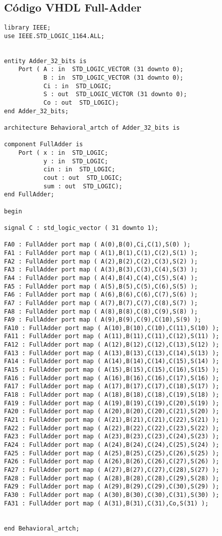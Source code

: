 \documentclass[12pt]{article}
\begin{document}
\subsection{Código VHDL Full-Adder}
\begin{lstlisting}
library IEEE;
use IEEE.STD_LOGIC_1164.ALL;


entity Adder_32_bits is
    Port ( A : in  STD_LOGIC_VECTOR (31 downto 0);
           B : in  STD_LOGIC_VECTOR (31 downto 0);
           Ci : in  STD_LOGIC;
           S : out  STD_LOGIC_VECTOR (31 downto 0);
           Co : out  STD_LOGIC);
end Adder_32_bits;

architecture Behavioral_artch of Adder_32_bits is

component FullAdder is
    Port ( x : in  STD_LOGIC;
           y : in  STD_LOGIC;
           cin : in  STD_LOGIC;
           cout : out  STD_LOGIC;
           sum : out  STD_LOGIC);
end FullAdder;

begin

signal C : std_logic_vector ( 31 downto 1);

FA0 : FullAdder port map ( A(0),B(0),Ci,C(1),S(0) );
FA1 : FullAdder port map ( A(1),B(1),C(1),C(2),S(1) );
FA2 : FullAdder port map ( A(2),B(2),C(2),C(3),S(2) );
FA3 : FullAdder port map ( A(3),B(3),C(3),C(4),S(3) );
FA4 : FullAdder port map ( A(4),B(4),C(4),C(5),S(4) );
FA5 : FullAdder port map ( A(5),B(5),C(5),C(6),S(5) );
FA6 : FullAdder port map ( A(6),B(6),C(6),C(7),S(6) );
FA7 : FullAdder port map ( A(7),B(7),C(7),C(8),S(7) );
FA8 : FullAdder port map ( A(8),B(8),C(8),C(9),S(8) );
FA9 : FullAdder port map ( A(9),B(9),C(9),C(10),S(9) );
FA10 : FullAdder port map ( A(10),B(10),C(10),C(11),S(10) );
FA11 : FullAdder port map ( A(11),B(11),C(11),C(12),S(11) );
FA12 : FullAdder port map ( A(12),B(12),C(12),C(13),S(12) );
FA13 : FullAdder port map ( A(13),B(13),C(13),C(14),S(13) );
FA14 : FullAdder port map ( A(14),B(14),C(14),C(15),S(14) );
FA15 : FullAdder port map ( A(15),B(15),C(15),C(16),S(15) );
FA16 : FullAdder port map ( A(16),B(16),C(16),C(17),S(16) );
FA17 : FullAdder port map ( A(17),B(17),C(17),C(18),S(17) );
FA18 : FullAdder port map ( A(18),B(18),C(18),C(19),S(18) );
FA19 : FullAdder port map ( A(19),B(19),C(19),C(20),S(19) );
FA20 : FullAdder port map ( A(20),B(20),C(20),C(21),S(20) );
FA21 : FullAdder port map ( A(21),B(21),C(21),C(22),S(21) );
FA22 : FullAdder port map ( A(22),B(22),C(22),C(23),S(22) );
FA23 : FullAdder port map ( A(23),B(23),C(23),C(24),S(23) );
FA24 : FullAdder port map ( A(24),B(24),C(24),C(25),S(24) );
FA25 : FullAdder port map ( A(25),B(25),C(25),C(26),S(25) );
FA26 : FullAdder port map ( A(26),B(26),C(26),C(27),S(26) );
FA27 : FullAdder port map ( A(27),B(27),C(27),C(28),S(27) );
FA28 : FullAdder port map ( A(28),B(28),C(28),C(29),S(28) );
FA29 : FullAdder port map ( A(29),B(29),C(29),C(30),S(29) );
FA30 : FullAdder port map ( A(30),B(30),C(30),C(31),S(30) );
FA31 : FullAdder port map ( A(31),B(31),C(31),Co,S(31) );


end Behavioral_artch;
\end{lstlisting}
\end{document}
